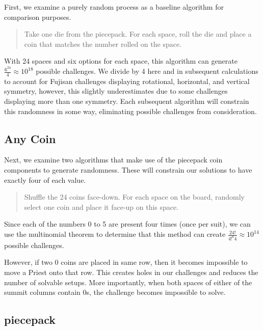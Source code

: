 \documentclass[10pt,journal,compsoc]{IEEEtran}
\begin{document}
First, we examine a purely random process as a baseline algorithm for comparison purposes.

\begin{quote}
    
  Take one die from the piecepack. For each space, roll the die and place a coin that matches the number rolled on the space.
\end{quote}

With 24 spaces and six options for each space, this algorithm can generate $\frac{6^{24}}{4} \approx 10^{18}$ possible challenges. We divide by 4 here and in subsequent calculations to account for Fujisan challenges displaying rotational, horizontal, and vertical symmetry, however, this slightly underestimates due to some challenges displaying more than one symmetry. Each subsequent algorithm will constrain this randomness in some way, eliminating possible challenges from consideration.

\subsection{Any Coin}

Next, we examine two algorithms that make use of the piecepack coin components to generate randomness. These will constrain our solutions to have exactly four of each value.

\begin{quote}
    
  Shuffle the 24 coins face-down. For each space on the board, randomly select one coin and place it face-up on this space.
  
\end{quote}

Since each of the numbers 0 to 5 are present four times (once per suit), we can use the multinomial theorem to determine that this method can create
$\frac{24!}{4!^{6}4} \approx 10^{14}$ possible challenges. 

However, if two 0 coins are placed in same row, then it becomes impossible to move a Priest onto that row. This creates holes in our challenges and reduces the number of solvable setups. 
More importantly, when both spaces of either of the summit columns contain 0s, the challenge becomes impossible to solve.


\subsection{piecepack}
\end{document}

